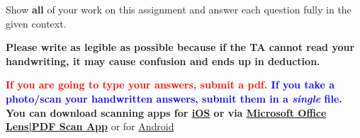 \documentclass[11pt]{article}\usepackage[]{graphicx}\usepackage[]{color}
\begin{document}

\pagestyle{fancy} 

Show \textbf{all} of your work on this assignment and answer each question fully in the given context. 

\vspace{0.3cm}

\textbf{Please write as legible as possible because if the TA cannot read your handwriting, it may cause confusion and ends up in deduction.}

\vspace{0.3cm}

\textbf{\textcolor{red}{If you are going to type your answers, submit a pdf. }\textcolor{blue}{ If you take a photo/scan your handwritten answers, submit them in a \emph{single} file.}} \\
\textbf{You can download scanning apps for \href{https://www.cnet.com/news/how-to-use-ios-11s-notes-app-as-a-document-scanner/}{ iOS} or via \href{https://play.google.com/store/apps/details?id=com.microsoft.office.officelens&hl=en_US}{ Microsoft Office Lens|PDF Scan App} } or for \href{https://www.howtogeek.com/166610/who-needs-a-scanner-scan-a-document-to-pdf-with-your-android-phone/}{ Android}
\end{document}
